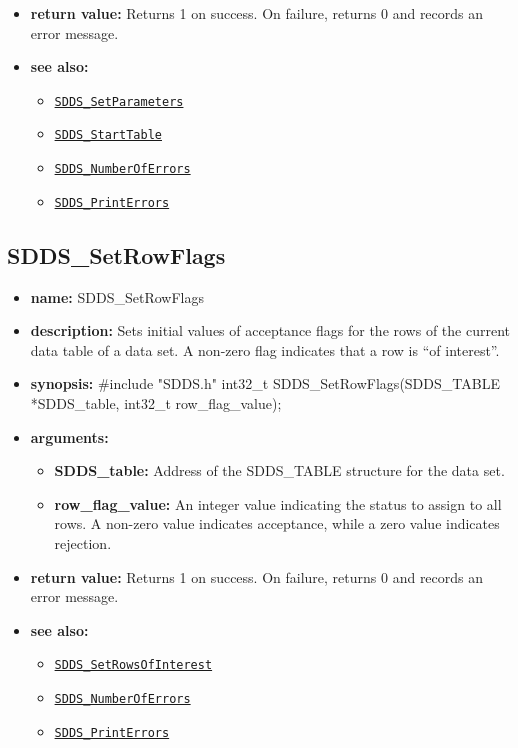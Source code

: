 \documentclass[11pt]{article}
\newcommand{\progref}[1]{\hyperref[SDDS_#1]{\tt SDDS\_#1}}
\begin{document}
\begin{itemize}
\begin{itemize}
\begin{itemize}
\end{itemize}
\end{itemize}
\item {\bf return value:}\newline
Returns 1 on success. On failure, returns 0 and records an error message.
\item {\bf see also:}
\begin{itemize}
\item \progref{SetParameters}
\item \progref{StartTable}
\item \progref{NumberOfErrors}
\item \progref{PrintErrors}
\end{itemize}
\end{itemize}

\subsection{SDDS\_SetRowFlags}
\label{SDDS_SetRowFlags}

\begin{itemize}
\item {\bf name:}\newline
SDDS\_SetRowFlags
\item {\bf description:}\newline
Sets initial values of acceptance flags for the rows of the current data table of a data set. A non-zero flag indicates that a row is ``of interest''.
\item {\bf synopsis:} \#include "SDDS.h"\newline
int32\_t SDDS\_SetRowFlags(SDDS\_TABLE *SDDS\_table, int32\_t row\_flag\_value);
\item {\bf arguments:}
\begin{itemize}
\item {\bf SDDS\_table:} Address of the SDDS\_TABLE structure for the data set.
\item {\bf row\_flag\_value:} An integer value indicating the status to assign to all rows. A non-zero value indicates acceptance, while a zero value indicates rejection.
\end{itemize}
\item {\bf return value:}\newline
Returns 1 on success. On failure, returns 0 and records an error message.
\item {\bf see also:}
\begin{itemize}
\item \progref{SetRowsOfInterest}
\item \progref{NumberOfErrors}
\item \progref{PrintErrors}
\end{itemize}
\end{itemize}
\end{document}
